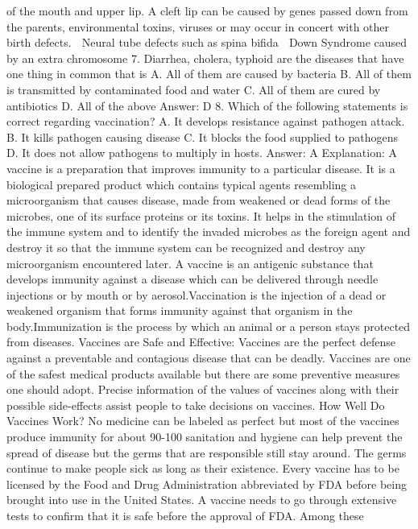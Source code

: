 of the mouth and upper lip. A cleft lip can be caused by genes
passed down from the parents, environmental toxins, viruses or
may occur in concert with other birth defects.
 Neural tube defects such as spina bifida
 Down Syndrome caused by an extra chromosome
7. Diarrhea, cholera, typhoid are the diseases that have one
thing in common that is
A. All of them are caused by bacteria
B. All of them is transmitted by contaminated food and water
C. All of them are cured by antibiotics
D. All of the above
Answer: D
8. Which of the following statements is correct regarding
vaccination?
A. It develops resistance against pathogen attack.
B. It kills pathogen causing disease
C. It blocks the food supplied to pathogens
D. It does not allow pathogens to multiply in hosts.
Answer: A
Explanation: A vaccine is a preparation that improves immunity to a
particular disease. It is a biological prepared product which contains
typical agents resembling a microorganism that causes disease, made
from weakened or dead forms of the microbes, one of its surface
proteins or its toxins. It helps in the stimulation of the immune
system and to identify the invaded microbes as the foreign agent
and destroy it so that the immune system can be recognized and
destroy any microorganism encountered later.
A vaccine is an antigenic substance that develops immunity against a
disease which can be delivered through needle injections or by
mouth or by aerosol.Vaccination is the injection of a dead or
weakened organism that forms immunity against that organism in the
body.Immunization is the process by which an animal or a person
stays protected from diseases.
Vaccines are Safe and Effective:
Vaccines are the perfect defense against a preventable and
contagious disease that can be deadly. Vaccines are one of the
safest medical products available but there are some preventive
measures one should adopt. Precise information of the values of
vaccines along with their possible side-effects assist people to take
decisions on vaccines.
How Well Do Vaccines Work?
No medicine can be labeled as perfect but most of the vaccines
produce immunity for about 90-100%
sanitation and hygiene can help prevent the spread of disease but
the germs that are responsible still stay around. The germs continue
to make people sick as long as their existence.
Every vaccine has to be licensed by the Food and Drug
Administration abbreviated by FDA before being brought into use in
the United States. A vaccine needs to go through extensive tests to
confirm that it is safe before the approval of FDA. Among these
